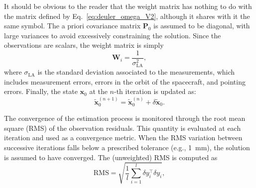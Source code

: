 \documentclass[lineno, pdflatex,sn-mathphys-ay]{sn-jnl}
\theoremstyle{thmstyleone}%
\theoremstyle{thmstyletwo}%
\theoremstyle{thmstylethree}%
\renewcommand{\vec}[1]{\boldsymbol{#1}}
\begin{document}
	It should be obvious to the reader that the weight matrix has nothing to do with the matrix defined by Eq.~\eqref{eq:deuler_omega_V2}, although it shares with it the same symbol.
	The a priori covariance matrix $\boldsymbol{P}_0$ is assumed to be diagonal, with large variances to avoid excessively constraining the solution.
	Since the observations are scalars, the weight matrix is simply
	\begin{equation}
		\vec{W}_i = 
		\frac{1}{\sigma_{\mathrm{LA}}^2},
	\end{equation}
	where $\sigma_{\mathrm{LA}}$ is the standard deviation associated to the measurements, which includes measurement errors, errors in the orbit of the spacecraft, and pointing errors.
	Finally, the state \( \vec{x}_0\) at the $n$-th iteration is updated as:	
	\begin{equation}
		\tilde{\vec{x}}_0^{(n+1)}= \tilde{\vec{x}}_0^{(n)} +  \delta\tilde{\vec{x}}_0.
	\end{equation}
	
	
			


The convergence of the estimation process is monitored through the root mean square (RMS) of the observation residuals. This quantity is evaluated at each iteration and used as a convergence metric. When the RMS variation between successive iterations falls below a prescribed tolerance (e.g., \SI{1}{mm}), the solution is assumed to have converged.
%
The (unweighted) RMS is computed as
%
\begin{equation}
	\label{eq:RMS}
	\mathrm{RMS}
	=
	\sqrt{\frac{1}{l}\sum_{i=1}^{l}\delta{y}_i^\top \delta{y}_i},
\end{equation}
\end{document}
